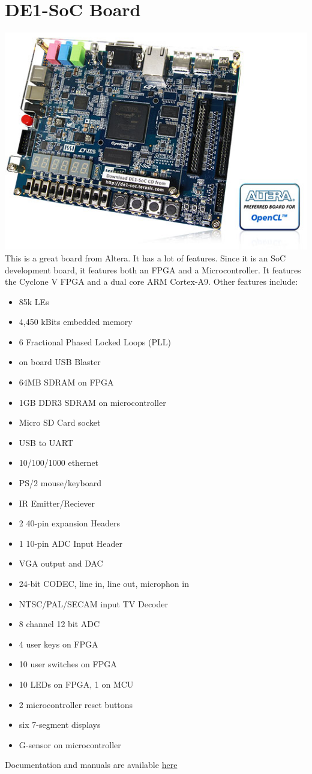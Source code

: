 \documentclass{article}
\begin{document}
	\section{DE1-SoC Board}
	\includegraphics[scale=0.5]{de1}
	This is a great board from Altera. It has a lot of features. Since it is an SoC development board,
	it features both an FPGA and a Microcontroller. It features the Cyclone V FPGA and a dual core
	ARM Cortex-A9. Other features include:
		\begin{itemize}
		\item 85k LEs
		\item 4,450 kBits embedded memory
		\item 6 Fractional Phased Locked Loops (PLL)
		\item on board USB Blaster
		\item 64MB SDRAM on FPGA
		\item 1GB DDR3 SDRAM on microcontroller
		\item Micro SD Card socket
		\item USB to UART
		\item 10/100/1000 ethernet
		\item PS/2 mouse/keyboard
		\item IR Emitter/Reciever
		\item 2 40-pin expansion Headers
		\item 1 10-pin ADC Input Header
		\item VGA output and DAC
		\item 24-bit CODEC, line in, line out, microphon in
		\item NTSC/PAL/SECAM input TV Decoder
		\item 8 channel 12 bit ADC
		\item 4 user keys on FPGA
		\item 10 user switches on FPGA
		\item 10 LEDs on FPGA, 1 on MCU
		\item 2 microcontroller reset buttons
		\item six 7-segment displays
		\item G-sensor on microcontroller
		\end{itemize}
	Documentation and manuals are available 
	\href{http://www.terasic.com.tw/cgi-bin/page/archive.pl?Language=English&CategoryNo=165&No=836&PartNo=4}{here}
	
\end{document}
